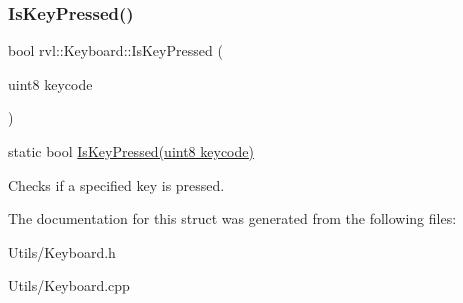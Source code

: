 \subsubsection{\texorpdfstring{Is\+Key\+Pressed()}{IsKeyPressed()}}
{\footnotesize\ttfamily bool rvl\+::\+Keyboard\+::\+Is\+Key\+Pressed (\begin{DoxyParamCaption}\item[{uint8}]{keycode }\end{DoxyParamCaption})\hspace{0.3cm}{\ttfamily [static]}}



static bool \hyperlink{structrvl_1_1_keyboard_aad30f3f55bf55d1280d11aa69032b59c}{Is\+Key\+Pressed(uint8 keycode)} 

Checks if a specified key is pressed. 

The documentation for this struct was generated from the following files\+:\begin{DoxyCompactItemize}
\item 
Utils/Keyboard.\+h\item 
Utils/Keyboard.\+cpp\end{DoxyCompactItemize}
